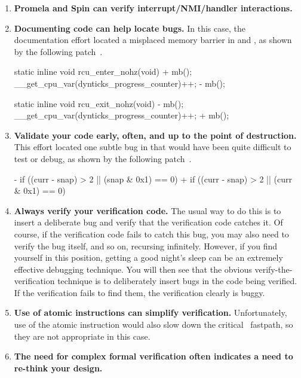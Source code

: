 \begin{enumerate}
\item	{\bf Promela and Spin can verify interrupt\slash NMI\-/handler
	interactions.}
\item	{\bf Documenting code can help locate bugs.}
	In this case, the documentation effort located
	a misplaced memory barrier in
	 and ,
	as shown by the following patch~\cite{PaulEMcKenney2008commit:d7c0651390b6}.

\begin{VerbatimU}
 static inline void rcu_enter_nohz(void)
 {
+       mb();
        __get_cpu_var(dynticks_progress_counter)++;
-       mb();
 }

 static inline void rcu_exit_nohz(void)
 {
-       mb();
        __get_cpu_var(dynticks_progress_counter)++;
+       mb();
 }
\end{VerbatimU}

\item	{\bf Validate your code early, often, and up to the point
	of destruction.}
	This effort located one subtle bug in
	that would have been quite difficult to test or debug, as
	shown by the following patch~\cite{PaulEMcKenney2008commit:ae66be9b71b1}.

\begin{VerbatimU}
-       if ((curr - snap) > 2 || (snap & 0x1) == 0)
+       if ((curr - snap) > 2 || (curr & 0x1) == 0)
\end{VerbatimU}

\item	{\bf Always verify your verification code.}
	The usual way to do this is to insert a deliberate bug
	and verify that the verification code catches it.  Of course,
	if the verification code fails to catch this bug, you may also
	need to verify the bug itself, and so on, recursing infinitely.
	However, if you find yourself in this position,
	getting a good night's sleep
	can be an extremely effective debugging technique.
	You will then see that the obvious verify-the-verification
	technique is to deliberately insert bugs in the code being
	verified.
	If the verification fails to find them, the verification clearly
	is buggy.
\item	{\bf Use of atomic instructions can simplify verification.}
	Unfortunately, use of the  atomic instruction
	would also slow down the critical \IRQ\ fastpath, so they
	are not appropriate in this case.
\item	{\bf The need for complex formal verification often indicates
	a need to re-think your design.}
\end{enumerate}

